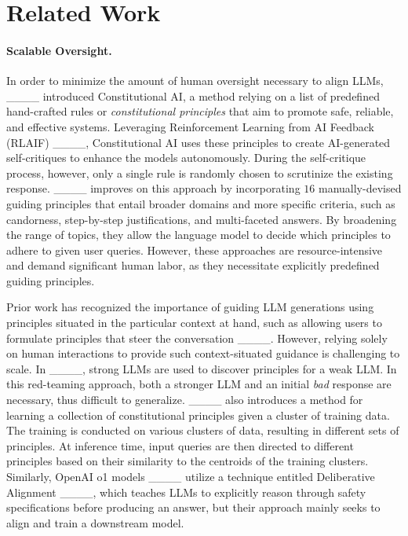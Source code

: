 \section{Related Work}
\paragraph{Scalable Oversight.} In order to minimize the amount of human oversight necessary to align LLMs, ____ introduced Constitutional AI, a method relying on a list of predefined hand-crafted rules or \emph{constitutional principles} that aim to promote safe, reliable, and effective systems. Leveraging Reinforcement Learning from AI Feedback (RLAIF) ____, Constitutional AI uses these principles to create AI-generated self-critiques to enhance the models autonomously. During the self-critique process, however, only a single rule is randomly chosen to scrutinize the existing response. ____ improves on this approach by incorporating $16$ manually-devised guiding principles that entail broader domains and more specific criteria, such as candorness, step-by-step justifications, and multi-faceted answers. By broadening the range of topics, they allow the language model to decide which principles to adhere to given user queries. However, these approaches are resource-intensive and demand significant human labor, as they necessitate explicitly predefined guiding principles.

Prior work has recognized the importance of guiding LLM generations using principles situated in the particular context at hand, such as allowing users to formulate principles that steer the conversation ____. However, relying solely on human interactions to provide such context-situated guidance is challenging to scale. In ____, strong LLMs are used to discover principles for a weak LLM. In this red-teaming approach, both a stronger LLM and an initial \emph{bad} response are necessary, thus difficult to generalize. ____ also introduces a method for learning a collection of constitutional principles given a cluster of training data. The training is conducted on various clusters of data, resulting in different sets of principles. At inference time, input queries are then directed to different principles based on their similarity to the centroids of the training clusters. Similarly,  OpenAI o1 models ____ utilize a technique entitled Deliberative Alignment ____, which teaches LLMs to explicitly reason through safety specifications before producing an answer, but their approach mainly seeks to align and train a downstream model.

